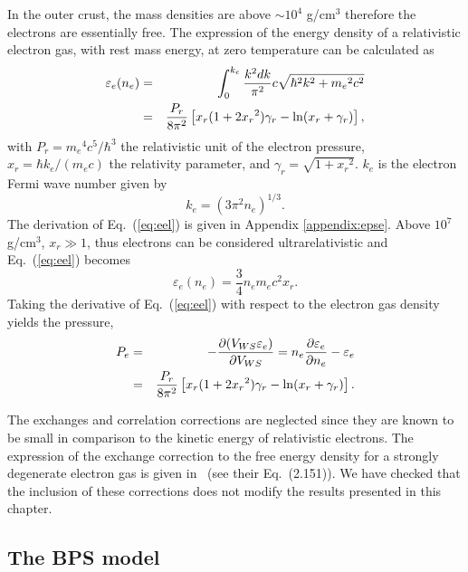 In the outer crust, the mass densities are above $\sim 10^4$ g/cm$^3$ therefore 
the electrons are essentially free. 
The expression of the energy density of a relativistic electron gas, with rest
mass energy, at zero temperature can be calculated as
%
\begin{eqnarray}
  \varepsilon_e(n_e) &=& \int_0^{k_e}\frac{k^2dk}{\pi^2}c\sqrt{\hbar^2k^2 +
  {m_e}^2c^2}\notag \\
   &=& \frac{P_r}{8\pi^2}\left[x_r (1+2{x_r}^2)\gamma_r -
   \ln(x_r + \gamma_r)\right],\label{eq:eel}
\end{eqnarray}
%
with $P_r = {m_e}^4c^5/\hbar^3$ the relativistic unit of the electron pressure, 
$x_r = \hbar k_e/(m_ec)$ the relativity parameter, and $\gamma_r =
\sqrt{1 + {x_r}^2}$. $k_e$ is the electron Fermi wave number given by
%
\begin{equation}
  k_e = (3\pi^2n_e)^{1/3}.
\end{equation}
%
The derivation of Eq.~(\ref{eq:eel}) is given in Appendix \ref{appendix:epse}. 
Above $10^7$ g/cm$^3$, $x_r \gg 1$, thus electrons can be considered 
ultrarelativistic and Eq.~(\ref{eq:eel}) becomes
%
\begin{equation}
  \varepsilon_e(n_e) = \frac{3}{4}n_e m_e c^2 x_r.\label{eq:eeur}
\end{equation}
%
Taking the derivative of Eq.~(\ref{eq:eel}) with respect to the electron gas 
density yields the pressure,
%
\begin{eqnarray}
  P_e &=& -\frac{\partial (V_{WS}\varepsilon_e)}{\partial V_{WS}} = n_e\frac{\partial
  \varepsilon_e}{\partial n_e} - \varepsilon_e \notag\\
      &=& \frac{P_r}{8\pi^2}\left[x_r(1+2{x_r}^2)\gamma_r - \ln(x_r +
      \gamma_r)\right].\label{eq:pel}
\end{eqnarray}
%

The exchanges and correlation corrections are neglected since they are known 
to be small in comparison to the kinetic energy of relativistic electrons. The 
expression of the exchange correction to the free energy density for a strongly 
degenerate electron gas is given in~\cite{Haensel2007} (see their Eq.~(2.151)).
We have checked that the inclusion of these corrections does not modify the
results presented in this chapter.

\subsection{The BPS model}\label{subsec:bps}


